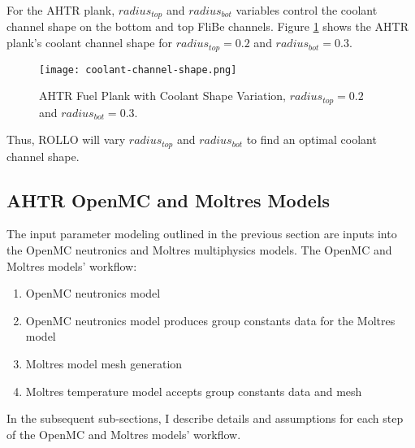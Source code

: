 For the \gls{AHTR} plank, $radius_{top}$ and $radius_{bot}$ variables control the coolant channel 
shape on the bottom and top FliBe channels. 
Figure \ref{fig:coolant-channel-shape} shows the \gls{AHTR} plank's coolant channel shape 
for $radius_{top} = 0.2$ and $radius_{bot} = 0.3$.
\begin{figure}[htbp]
    \centering
        \texttt{[image: coolant-channel-shape.png]}
    \raggedright
    \caption{AHTR Fuel Plank with Coolant Shape Variation, $radius_{top} 
    = 0.2$ and $radius_{bot} = 0.3$.}  
    \label{fig:coolant-channel-shape}
\end{figure}
Thus, \gls{ROLLO} will vary $radius_{top}$ and $radius_{bot}$ to find an optimal coolant 
channel shape.


\subsection{AHTR OpenMC and Moltres Models}
\label{sec:ahtr-moltres-hom}
The input parameter modeling outlined in the previous section are inputs into 
the OpenMC neutronics and Moltres multiphysics models. 
The OpenMC and Moltres models' workflow:  
\begin{enumerate}
\item OpenMC neutronics model
\item OpenMC neutronics model produces group constants data for the Moltres 
model
\item Moltres model mesh generation 
\item Moltres temperature model accepts group constants data and mesh
\end{enumerate}
In the subsequent sub-sections, I describe details and assumptions for each step of 
the OpenMC and Moltres models' workflow.


